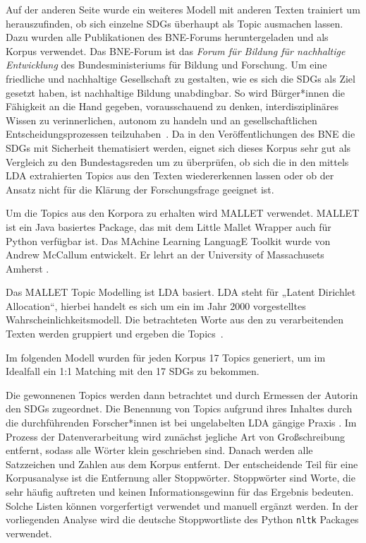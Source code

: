 \documentclass[a4paper,11pt]{article}
\begin{document}
Auf der anderen Seite wurde ein weiteres Modell mit anderen Texten trainiert
um herauszufinden, ob sich einzelne SDGs überhaupt als Topic ausmachen lassen.
Dazu wurden alle Publikationen des BNE-Forums heruntergeladen und als Korpus
verwendet. Das BNE-Forum ist das \emph{Forum für Bildung für nachhaltige
  Entwicklung} des Bundesministeriums für Bildung und Forschung. Um eine
friedliche und nachhaltige Gesellschaft zu gestalten, wie es sich die SDGs als
Ziel gesetzt haben, ist nachhaltige Bildung unabdingbar. So wird Bürger*innen
die Fähigkeit an die Hand gegeben, vorausschauend zu denken,
interdisziplinäres Wissen zu verinnerlichen, autonom zu handeln und an
gesellschaftlichen Entscheidungsprozessen teilzuhaben~\cite{BNE}. Da in den
Veröffentlichungen des BNE die SDGs mit Sicherheit thematisiert werden, eignet
sich dieses Korpus sehr gut als Vergleich zu den Bundestagsreden um zu
überprüfen, ob sich die in den mittels LDA extrahierten Topics aus den Texten
wiedererkennen lassen oder ob der Ansatz nicht für die Klärung der
Forschungsfrage geeignet ist.

Um die Topics aus den Korpora zu erhalten wird MALLET verwendet. MALLET ist
ein Java basiertes Package, das mit dem Little Mallet Wrapper auch für Python
verfügbar ist. Das MAchine Learning LanguagE Toolkit wurde von Andrew McCallum
entwickelt. Er lehrt an der University of Massachusets Amherst \cite{MALLET,
  MALLET_WELSH}.

Das MALLET Topic Modelling ist LDA basiert. LDA steht für „Latent Dirichlet
Alloca\-tion“, hierbei handelt es sich um ein im Jahr 2000 vorgestelltes
Wahrscheinlichkeitsmodell. Die betrachteten Worte aus den zu verarbeitenden
Texten werden gruppiert und ergeben die Topics~\cite{LDA}.

Im folgenden Modell wurden für jeden Korpus 17 Topics generiert, um im
Idealfall ein 1:1 Matching mit den 17 SDGs zu bekommen.

Die gewonnenen Topics werden dann betrachtet und durch Ermessen der Autorin
den SDGs zugeordnet. Die Benennung von Topics aufgrund ihres Inhaltes durch
die durchführenden Forscher*innen ist bei ungelabelten LDA gängige Praxis
\cite{Ramage}.  Im Prozess der Datenverarbeitung wird zunächst jegliche Art von
Großschreibung entfernt, sodass alle Wörter klein geschrieben sind. Danach
werden alle Satzzeichen und Zahlen aus dem Korpus entfernt. Der entscheidende
Teil für eine Korpusanalyse ist die Entfernung aller Stoppwörter. Stoppwörter
sind Worte, die sehr häufig auftreten und keinen Informationsgewinn für das
Ergebnis bedeuten. Solche Listen können vorgerfertigt verwendet und manuell
ergänzt werden. In der vorliegenden Analyse wird die deutsche Stoppwortliste
des Python \texttt{nltk} Packages verwendet.
\end{document}
